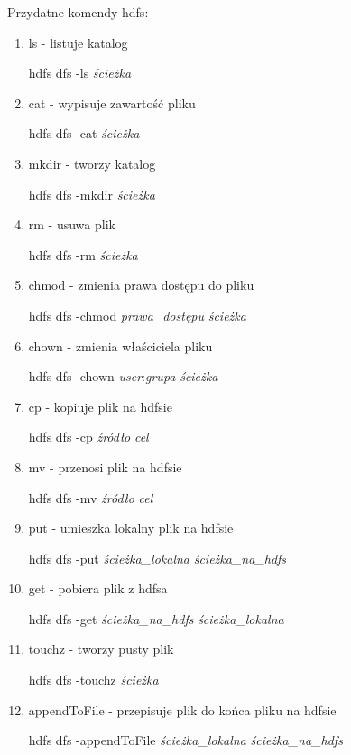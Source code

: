 \documentclass[11pt]{article}
\begin{document}
Przydatne komendy hdfs:
\begin{enumerate}
\item ls - listuje katalog

hdfs dfs -ls \textit{ścieżka}

\item cat - wypisuje zawartość pliku

hdfs dfs -cat \textit{ścieżka}

\item mkdir - tworzy katalog

hdfs dfs -mkdir \textit{ścieżka}
 
\item rm - usuwa plik

hdfs dfs -rm \textit{ścieżka}

\item chmod - zmienia prawa dostępu do pliku

hdfs dfs -chmod \textit{prawa\_dostępu} \textit{ścieżka}

\item chown - zmienia właściciela pliku

hdfs dfs -chown \textit{user}:\textit{grupa} \textit{ścieżka}

\item cp - kopiuje plik na hdfsie

hdfs dfs -cp \textit{źródło} \textit{cel}

\item mv - przenosi plik na hdfsie

hdfs dfs -mv \textit{źródło} \textit{cel}

\item put - umieszka lokalny plik na hdfsie

hdfs dfs -put \textit{ścieżka\_lokalna} \textit{ścieżka\_na\_hdfs}

\item get - pobiera plik z hdfsa

hdfs dfs -get \textit{ścieżka\_na\_hdfs} \textit{ścieżka\_lokalna}

\item touchz - tworzy pusty plik

hdfs dfs -touchz \textit{ścieżka}

\item appendToFile - przepisuje plik do końca pliku na hdfsie

hdfs dfs -appendToFile \textit{ścieżka\_lokalna} \textit{ścieżka\_na\_hdfs}

\end{enumerate}
\end{document}
